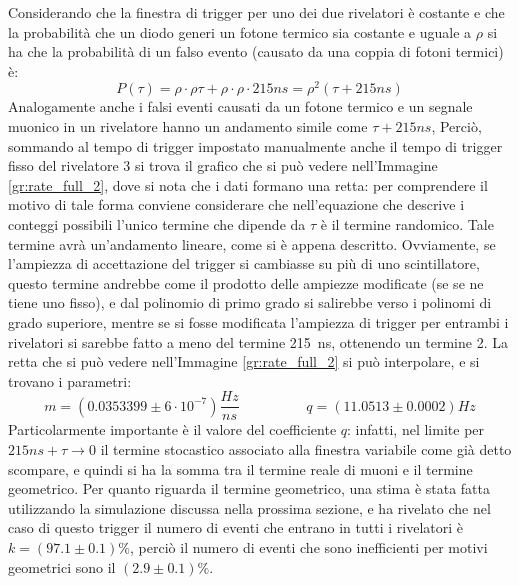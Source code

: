 Considerando che la finestra di trigger per uno dei due rivelatori è costante e che la probabilità che un diodo generi un fotone termico sia costante e uguale a $\rho$ si ha che la probabilità di un falso evento (causato da una coppia di fotoni termici) è:
\begin{equation}
  P(\tau)= \rho \cdot \rho \tau + \rho \cdot \rho \cdot 215 ns = \rho^2 (\tau + 215 ns) 
\end{equation}
Analogamente anche i falsi eventi causati da un fotone termico e un segnale muonico in un rivelatore hanno un andamento simile come $\tau +215 ns$,
Perciò, sommando al tempo di trigger impostato manualmente anche il tempo di trigger fisso del rivelatore $3$ si trova il grafico che si può vedere nell'Immagine \ref{gr:rate_full_2}, dove si nota che i dati formano una retta: per comprendere il motivo di tale forma conviene considerare che nell'equazione che descrive i conteggi possibili l'unico termine che dipende da $\tau$ è il termine randomico.
Tale termine avrà un'andamento lineare, come si \`e appena descritto. 
Ovviamente, se l'ampiezza di accettazione del trigger si cambiasse su più di uno scintillatore, questo termine andrebbe come il prodotto delle ampiezze modificate (se se ne tiene uno fisso), e dal polinomio di primo grado si salirebbe verso i polinomi di grado superiore, mentre se si fosse modificata l'ampiezza di trigger per entrambi i rivelatori si sarebbe fatto a meno del termine 215~ns, ottenendo un termine 2.
La retta che si può vedere nell'Immagine \ref{gr:rate_full_2} si può interpolare, e si trovano i parametri:
\begin{equation}
  m = (0.0353399 \pm 6 \cdot 10^{-7}) \frac{Hz}{ns} \hspace{2cm} q = (11.0513 \pm 0.0002) Hz
\end{equation}
Particolarmente importante è il valore del coefficiente $q$: infatti, nel limite per $ 215 ns + \tau \to 0$ il termine stocastico associato alla finestra variabile come già detto scompare, e quindi si ha la somma tra il termine reale di muoni e il termine geometrico. Per quanto riguarda il termine geometrico, una stima è stata fatta utilizzando la simulazione discussa nella prossima sezione, e ha rivelato che nel caso di questo trigger il numero di eventi che entrano in tutti i rivelatori è $k = (97.1 \pm 0.1) \%$, perciò il numero di eventi che sono inefficienti per motivi geometrici sono il $(2.9 \pm 0.1) \%$.\\


